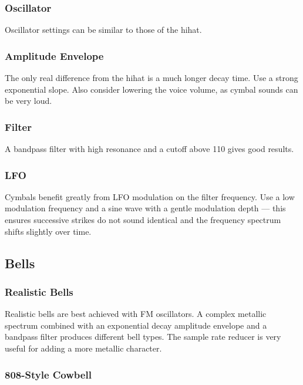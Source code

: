 \subsubsection{Oscillator}\label{oscillator-3}

Oscillator settings can be similar to those of the hihat.

\subsubsection{Amplitude Envelope}\label{amplitude-envelope-4}

The only real difference from the hihat is a much longer decay time. Use
a strong exponential slope. Also consider lowering the voice volume, as
cymbal sounds can be very loud.

\subsubsection{Filter}\label{filter-2}

A bandpass filter with high resonance and a cutoff above 110 gives good
results.

\subsubsection{LFO}\label{lfo}

Cymbals benefit greatly from LFO modulation on the filter frequency. Use
a low modulation frequency and a sine wave with a gentle modulation
depth --- this ensures successive strikes do not sound identical and the
frequency spectrum shifts slightly over time.

\subsection{Bells}\label{bells}

\subsubsection{Realistic Bells}\label{realistic-bells}

Realistic bells are best achieved with FM oscillators. A complex
metallic spectrum combined with an exponential decay amplitude envelope
and a bandpass filter produces different bell types. The sample rate
reducer is very useful for adding a more metallic character.

\subsubsection{808-Style Cowbell}\label{style-cowbell}

